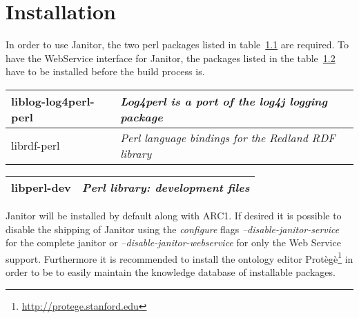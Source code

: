 \chapter{Installation} 




In order to use Janitor, the two perl packages listed in table~\ref{tab:install_dependencies} are required. To have the WebService interface for Janitor, the packages listed in the table~\ref{tab:install_dependencies_optional} 
have to be installed before the build process is.
\begin{table}[!h]
   \begin{center}
        \label{tab:install_dependencies}
	\begin{tabular}{|p{3cm}|p{7cm}|}
	\hline
	   liblog-log4perl-perl & \textit{Log4perl is a port of the log4j logging package}\\
	\hline
	   librdf-perl          & \textit{Perl language bindings for the Redland RDF library}\\
	\hline
	\end{tabular} 
   \end{center}
\end{table}
\begin{table}[!h]
   \begin{center}
        \label{tab:install_dependencies_optional}
	\begin{tabular}{|p{3cm}|p{7cm}|}
	\hline
	   libperl-dev & \textit{ Perl library: development files}\\
	\hline
	\end{tabular}
   \end{center}
\end{table}
\forcelinebreak

Janitor will be installed by default along with ARC1. If desired it is possible to disable the shipping of Janitor 
using the \textit{configure} flags \textit{--disable-janitor-service} for the complete janitor or 
\textit{--disable-janitor-webservice} for only the Web Service support.
Furthermore it is recommended to install the ontology editor 
Prot\`eg\`e\footnote{\href{http://protege.stanford.edu}{http://protege.stanford.edu}} in order to be to easily maintain the 
knowledge database of installable packages.







